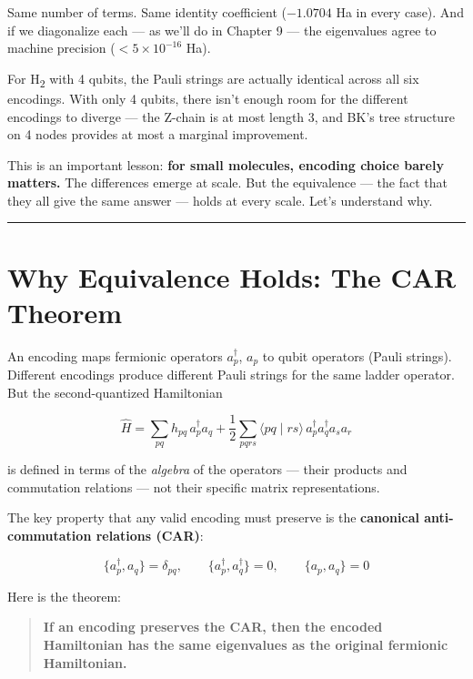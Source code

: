 \documentclass[
  11pt,
  oneside]{book}
\begin{document}
Same number of terms. Same identity coefficient (\(-1.0704\) Ha in every
case). And if we diagonalize each --- as we'll do in Chapter 9 --- the
eigenvalues agree to machine precision (\(< 5 \times 10^{-16}\) Ha).

For H\textsubscript{2} with 4 qubits, the Pauli strings are actually identical across
all six encodings. With only 4 qubits, there isn't enough room for the
different encodings to diverge --- the Z-chain is at most length 3, and
BK's tree structure on 4 nodes provides at most a marginal improvement.

This is an important lesson: \textbf{for small molecules, encoding
choice barely matters.} The differences emerge at scale. But the
equivalence --- the fact that they all give the same answer --- holds at
every scale. Let's understand why.

\begin{center}\rule{0.5\linewidth}{0.5pt}\end{center}

\section{Why Equivalence Holds: The CAR
Theorem}\label{why-equivalence-holds-the-car-theorem}

An encoding maps fermionic operators \(a_p^\dagger\), \(a_p\) to qubit
operators (Pauli strings). Different encodings produce different Pauli
strings for the same ladder operator. But the second-quantized
Hamiltonian

\[\hat{H} = \sum_{pq} h_{pq}\, a_p^\dagger a_q + \frac{1}{2}\sum_{pqrs} \langle pq \mid rs\rangle\, a_p^\dagger a_q^\dagger a_s a_r\]

is defined in terms of the \emph{algebra} of the operators --- their
products and commutation relations --- not their specific matrix
representations.

The key property that any valid encoding must preserve is the
\textbf{canonical anti-commutation relations (CAR)}:

\[\{a_p^\dagger, a_q\} = \delta_{pq}, \qquad \{a_p^\dagger, a_q^\dagger\} = 0, \qquad \{a_p, a_q\} = 0\]

Here is the theorem:

\begin{quote}
\textbf{If an encoding preserves the CAR, then the encoded Hamiltonian
has the same eigenvalues as the original fermionic Hamiltonian.}
\end{quote}
\end{document}
